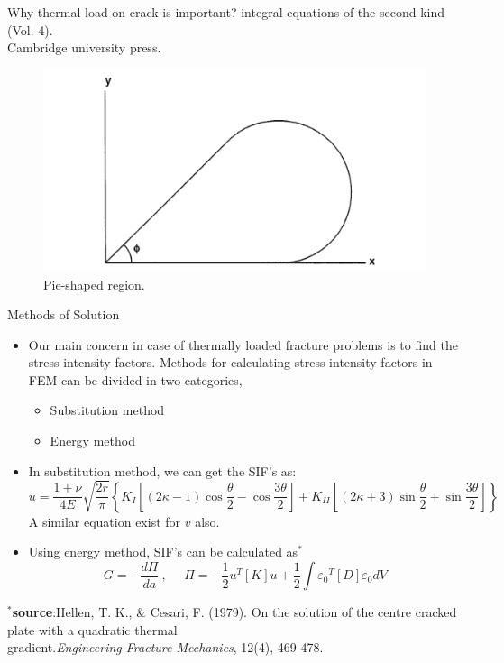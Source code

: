 \documentclass{beamer}
\begin{document}
\begin{frame}[t,fragile]{Why thermal load on crack is important?}
{    integral equations of the second kind} (Vol. 4). \\
  \hspace{10pt}
    Cambridge university press.
\begin{figure}
    \centering
    \vspace{-50pt}
    \includegraphics[width=.3\textwidth]{pie.png}
    \caption{\footnotesize Pie-shaped region.}
    \label{pie}
\end{figure}
 
\end{frame}
\begin{frame}[t,fragile]{Methods of Solution}
    \vspace{-.4cm}
    \begin{itemize}
        \item Our main concern in case of thermally loaded fracture problems is to find the stress intensity factors. Methods for calculating stress intensity factors in FEM can be divided in two categories,
            \begin{itemize}
                \item Substitution method 
                \item Energy method 
            \end{itemize}
        \item In substitution method, we can get the SIF's as:
            \footnotesize
            $$ u=\frac{1+\nu}{4E}\sqrt{\frac{2r}{\pi}}\left\{ K_I\left[ (2\kappa -1)\cos \frac{\theta}{2}-\cos \frac{3\theta}{2} \right]+K_{II}\left[ (2\kappa +3)\sin\frac{\theta}{2}+\sin\frac{3\theta}{2} \right] \right\}$$
            \normalsize
A similar equation exist for $v$ also. 
        \item Using energy method, SIF's can be calculated as$^\ast$ 
            \footnotesize
$$G=-\frac{d\Pi}{da}\ ,\ \ \ \ \ \  
\Pi=-\frac{1}{2}{u}^T[K]{u}+\frac{1}{2}\int{\varepsilon_0}^T[D]{\varepsilon_0}dV$$
 
    \end{itemize}
    \vspace{-.1cm}
   \tiny
   \hspace{15pt}
   $^\ast$\textbf{source}:Hellen, T. K., \& Cesari, F. (1979). On the solution of the centre cracked plate with a quadratic thermal\\ 
   \vspace{-7pt}
   \hspace{15pt}
   gradient.\emph{Engineering Fracture Mechanics}, 12(4), 469-478.
\end{frame} 
\end{document}
